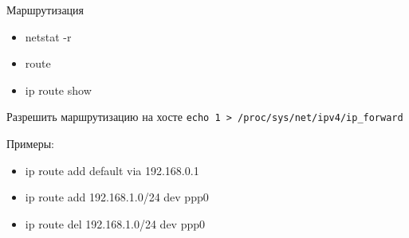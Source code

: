\begin{frame}{Маршрутизация}
	\begin{itemize}
		\item netstat -r
		\item route
		\item ip route show
	\end{itemize}

	\begin{block}{Разрешить маршрутизацию на хосте}
		{\tt echo 1 > /proc/sys/net/ipv4/ip\_forward}
	\end{block}

	Примеры:
	\begin{itemize}
		\item ip route add default via 192.168.0.1
		\item ip route add 192.168.1.0/24 dev ppp0
		\item ip route del 192.168.1.0/24 dev ppp0
	\end{itemize}

\end{frame}



